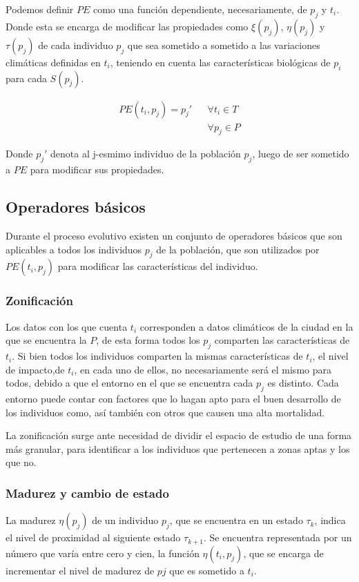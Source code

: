Podemos definir $PE$ como una función dependiente, necesariamente, de $p_{j}$ y $t_{i}$. Donde esta se encarga
de modificar las propiedades como $\xi(p_{j})$, $\eta(p_{j})$ y $\tau(p_{j})$ de cada individuo $p_{j}$ que sea
sometido a sometido a las variaciones climáticas definidas en $t_{i}$, teniendo en  cuenta las características
biológicas de $p_{i}$ para cada $S(p_{j})$.

\begin{align*}
PE (t_{i}, p_{j}) = p_{j}' & & \forall t_{i} \in T\\
& & \forall p_{j} \in P 
\end{align*}

Donde $p_{j}'$ denota al j-esmimo individuo de la población $p_{j}$, luego de ser sometido a $PE$ para modificar
sus propiedades.  

\subsection{Operadores básicos}

Durante el proceso evolutivo existen un conjunto de operadores básicos que son aplicables a todos los individuos
$p_{j}$ de la población, que son utilizados por $PE(t_{i},p_{j})$ para modificar las características del 
individuo.

\subsubsection{Zonificación}
Los datos con los que cuenta $t_{i}$ corresponden a datos climáticos de la ciudad en la que se encuentra la
$P$, de esta forma todos los $p_{j}$ comparten las características de $t_{i}$. Si bien todos los individuos
comparten la mismas características de $t_{i}$, el nivel de impacto,de $t_{i}$, en cada uno de ellos, no
necesariamente será el mismo para todos, debido a que el entorno en el que se encuentra cada $p_{j}$ es 
distinto. Cada entorno puede contar con factores que lo hagan apto para el buen desarrollo de los individuos
como, así también con otros que causen una alta mortalidad.

La zonificación surge ante necesidad de dividir el espacio de estudio de una forma más granular, para identificar
a los individuos que pertenecen a zonas aptas y los que no. 


\subsubsection{Madurez y cambio de estado}
La madurez $\eta (p_{j})$ de un individuo $p_{j}$, que se encuentra en un estado $\tau_{k}$, indica el nivel de
proximidad al siguiente estado $\tau_{k+1}$. Se encuentra representada por un número que varía entre
cero y cien, la función $\eta (t_{i}, p_{j})$, que se encarga de incrementar el nivel de madurez de $p{j}$
que es sometido a $t_{i}$.

